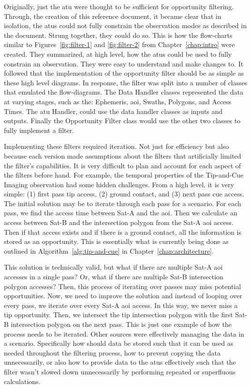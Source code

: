 Originally, just the \gls{atu} were thought to be sufficient for opportunity
filtering. Through, the creation of this reference document, it became clear
that in isolation, the \glspl{atu} could not fully constrain the observation
modes as described in the document. Strung together, they could do so.  This is
how the flow-charts similar to Figures~\ref{fig:filter-1} and
\ref{fig:filter-2} from Chapter~\ref{chap:intro} were created. They summarized,
at high level, how the \glspl{atu} could be used to fully constrain an
observation. They were easy to understand and make changes to. It followed that
the implementation of the opportunity filter should be as simple as these high
level diagrams. In response, the filter was split into a number of classes that
emulated the flow-diagrams. The Data Handler classes represented the data at
varying stages, such as the: Ephemeris, \gls{aoi}, Swaths, Polygons, and Access
Times. The \gls{atu} Handler, could use the data handler classes as inputs and
outputs. Finally the Opportunity Filter class would use the other two classes
to fully implement a filter.  

Implementing these filters required iteration. Not just for efficiency but also
because each version made assumptions about the filters that artificially
limited the filter's capabilities.  It is very difficult to plan and account
for each aspect of the filters before hand.  For example, the temporal
properties of the Tip-and-Cue Imaging observation had some hidden challenges.
From a high level, it is very simple: (1) first pass tip access, (2) ground
contact, and (3) next pass cue access. The initial solution may be to iterate
through each pass for a scenario. For each pass, we find the access time
between Sat-A and the \gls{aoi}. Then we calculate an access between Sat-B and
the intersection polygon from the Sat-A \gls{aoi} access. Then if that access
exists and if there is a ground contact, all the information is stored as an
opportunity. This is essentially what is currently being done as outlined in
Algorithm~\ref{alg:tip-and-cue} in Chapter~\ref{chap:architecture}.  

This solution is technically valid, but what if there are multiple Sat-A
\gls{aoi} accesses in a single pass? Or, what if there are multiple Sat-B
intersection polygon accesses? Then, this process of iterating over passes may
miss potential opportunities. Now, we need to improve the solution and instead
of looping over every pass, we iterate over every Sat-A \gls{aoi} access.  In
this way, we never miss a tip opportunity. Then, we intersect the tip
intersection polygon with the first Sat-B intersection polygon on the next
pass.  This is just one example of how the process needs to be iterated.  Other
sources were effectively managing the data in a scenario.  Specifically how
should data be stored such that it can be used as needed throughout the
filtering process, how to prevent copying the data unnecessarily, or also how
to provide data to the \glspl{atu} effectively such that the filter wasn't
slowed down unnecessarily by performing repeated or superfluous calculations.  

